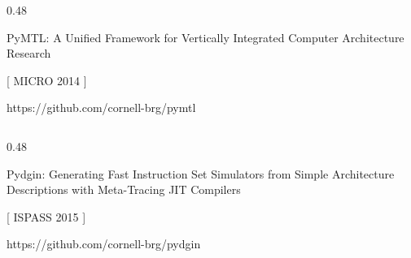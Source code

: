 \begin{frame}

\vspace{0.5in}
\begin{cbxcols}

  \begin{column}{0.48\tw}
    \centering

    \vspace{0.215in}

    PyMTL: A Unified Framework for Vertically Integrated Computer
    Architecture Research

    \vspace{0.39in}
    [ MICRO 2014 ]

    \vspace{0.05in}
    \small{https://github.com/cornell-brg/pymtl}
  \end{column}

  \begin{column}{0.48\tw}
    \centering


    \vspace{0.25in}

    Pydgin: Generating Fast Instruction Set Simulators from Simple
    Architecture Descriptions with Meta-Tracing JIT Compilers

    \vspace{0.2in}
    [ ISPASS 2015 ]

    \vspace{0.05in}
    \small{https://github.com/cornell-brg/pydgin}

  \end{column}
\end{cbxcols}
\end{frame}

